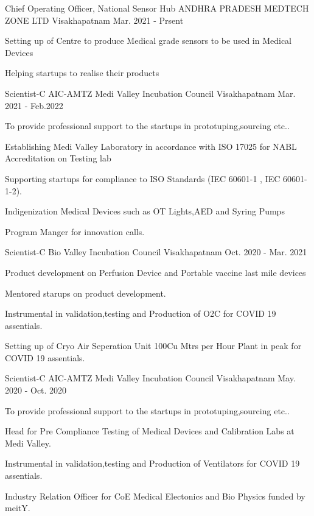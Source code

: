 \begin{cventries}
	
		\cventry
	{Chief Operating Officer, National Sensor Hub}
	{ANDHRA PRADESH MEDTECH ZONE LTD}
	{Visakhapatnam}
	{Mar. 2021 - Prsent}
	{
		\begin{cvitems}
			\item {Setting up of Centre to produce Medical grade sensors to be used in Medical Devices}
			\item { Helping startups to realise their products }
		\end{cvitems}
	}

	\cventry
	{Scientist-C}
	{AIC-AMTZ Medi Valley Incubation Council}
	{Visakhapatnam}
	{Mar. 2021 - Feb.2022}
	{
		\begin{cvitems}
			\item {To provide professional support to the startups in prototuping,sourcing etc..}
			\item { Establishing Medi Valley Laboratory in accordance with ISO 17025 for NABL Accreditation on Testing lab }
			\item {Supporting startups for compliance to ISO Standards (IEC 60601-1 , IEC 60601-1-2).}
			\item {Indigenization Medical Devices such as OT Lights,AED and Syring Pumps}
			\item {Program Manger for innovation calls.}
		\end{cvitems}
	}
	\cventry
	{Scientist-C}
	{Bio Valley Incubation Council}
	{Visakhapatnam}
	{Oct. 2020 - Mar. 2021}
	{
		\begin{cvitems}
			\item { Product development on Perfusion Device and Portable vaccine last mile devices}
			\item {Mentored starups on product development.}
			\item {Instrumental in validation,testing and Production of O2C for COVID 19 assentials.}
			\item {Setting up of Cryo Air Seperation Unit 100Cu Mtrs per Hour Plant in peak for COVID 19 assentials.}
		\end{cvitems}
	}

	\cventry
	{Scientist-C}
	{AIC-AMTZ Medi Valley Incubation Council}
	{Visakhapatnam}
	{May. 2020 - Oct. 2020}
	{
		\begin{cvitems}
			\item {To provide professional support to the startups in prototuping,sourcing etc..}			
			\item {Head for Pre Compliance Testing of Medical Devices and Calibration Labs at Medi Valley.}	
			\item {Instrumental in validation,testing and Production of Ventilators for COVID 19 assentials.}
			\item {Industry Relation Officer for CoE Medical Electonics and Bio Physics funded by meitY.}
		\end{cvitems}
	}



\end{cventries}
